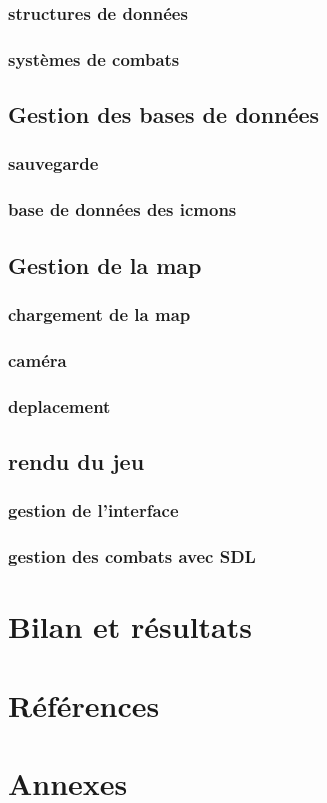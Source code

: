 \documentclass[12pt,a4paper, twoside]{article}
\begin{document}
    \subsubsection{structures de données}
    \subsubsection{systèmes de combats}

\subsection{Gestion des bases de données}
    \subsubsection{sauvegarde}
    \subsubsection{base de données des icmons}

\subsection{Gestion de la map}
    \subsubsection{chargement de la map}
    \subsubsection{caméra}
    \subsubsection{deplacement}

\subsection{rendu du jeu}
    \subsubsection{gestion de l'interface}
    \subsubsection{gestion des combats avec SDL}


\section{Bilan et résultats}
\section{Références}
\section{Annexes}
\end{document}
